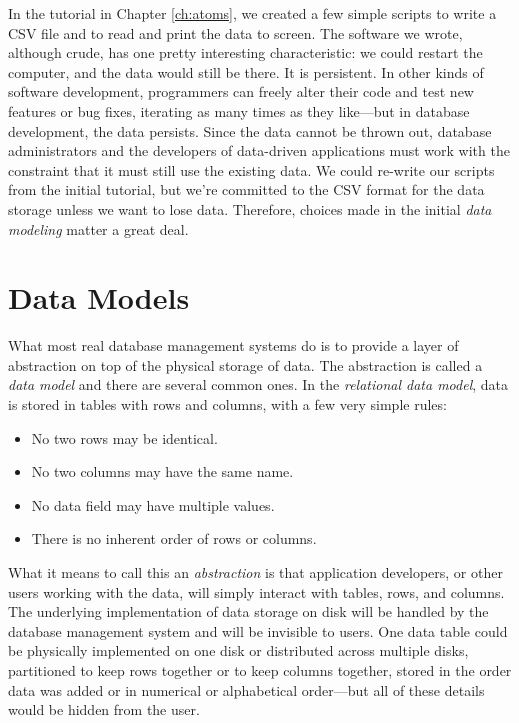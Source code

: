 \documentclass[11pt]{book}
\newcommand{\term}[1]{\emph{#1}} %
\begin{document}
In the tutorial in Chapter \ref{ch:atoms}, we created a few simple scripts to write a CSV file and to read and print the data to screen.  The software we wrote, although crude, has one pretty interesting characteristic: we could restart the computer, and the data would still be there.  It is persistent.  In other kinds of software development, programmers can freely alter their code and test new features or bug fixes, iterating as many times as they like---but in database development, the data persists.  Since the data cannot be thrown out, database administrators and the developers of data-driven applications must work with the constraint that it must still use the existing data.  We could re-write our scripts from the initial tutorial, but we're committed to the CSV format for the data storage unless we want to lose data.  Therefore, choices made in the initial \term{data modeling} matter a great deal.

\section{Data Models}
What most real database management systems do is to provide a layer of abstraction on top of the physical storage of data.  The abstraction is called a \term{data model} and there are several common ones.  In the \term{relational data model}, data is stored in tables with rows and columns, with a few very simple rules:

\begin{itemize}
    \item No two rows may be identical.
    \item No two columns may have the same name.
    \item No data field may have multiple values.
    \item There is no inherent order of rows or columns.
\end{itemize}

What it means to call this an \term{abstraction} is that application developers, or other users working with the data, will simply interact with tables, rows, and columns.  The underlying implementation of data storage on disk will be handled by the database management system and will be invisible to users.  One data table could be physically implemented on one disk or distributed across multiple disks, partitioned to keep rows together or to keep columns together, stored in the order data was added or in numerical or alphabetical order---but all of these details would be hidden from the user.
\end{document}
